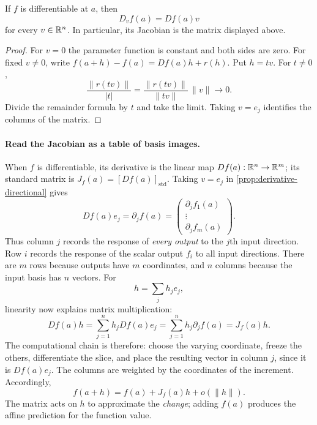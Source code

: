 \begin{proposition}
\label{prop:derivative-directional}
If $f$ is differentiable at $a$, then
\[
D_vf(a)=Df(a)v
\]
for every $v\in\mathbb{R}^n$.  In particular, its Jacobian is the matrix displayed
above.
\end{proposition}
\begin{proof}
For $v=0$ the parameter function is constant and both sides are zero.
For fixed $v\ne0$, write $f(a+h)-f(a)=Df(a)h+r(h)$. Put $h=tv$.
For $t\ne0$,
\[
\frac{\|r(tv)\|}{|t|}=\frac{\|r(tv)\|}{\|tv\|}\,\|v\|\longrightarrow0.
\]
Divide the remainder formula by $t$ and take the limit. Taking $v=e_j$
identifies the columns of the matrix.
\end{proof}

\paragraph{Read the Jacobian as a table of basis images.}
When $f$ is differentiable, its derivative is the linear map $Df(a):\mathbb{R}^n\to\mathbb{R}^m$; its standard
matrix is $J_f(a)=[Df(a)]_{\mathrm{std}}$. Taking $v=e_j$ in
\cref{prop:derivative-directional} gives
\[
Df(a)e_j=\partial_jf(a)=
\begin{pmatrix}\partial_jf_1(a)\\\vdots\\\partial_jf_m(a)\end{pmatrix}.
\]
Thus column $j$ records the response of \emph{every output} to the $j$th
input direction. Row $i$ records the response of the scalar output $f_i$
to all input directions. There are $m$ rows because outputs have $m$
coordinates, and $n$ columns because the input basis has $n$ vectors.
For
\[
h=\sum_j h_je_j,
\]
 linearity now explains matrix multiplication:
\[
Df(a)h=\sum_{j=1}^n h_jDf(a)e_j
=\sum_{j=1}^n h_j\partial_jf(a)=J_f(a)h.
\]
The computational chain is therefore: choose the varying coordinate,
freeze the others, differentiate the slice, and place the resulting vector
in column $j$, since it is $Df(a)e_j$. The columns are weighted by the
coordinates of the increment. Accordingly,
\[
f(a+h)=f(a)+J_f(a)h+o(\|h\|).
\]
The matrix acts on $h$ to approximate the \emph{change}; adding $f(a)$
produces the affine prediction for the function value.

\begin{center}\end{center}

